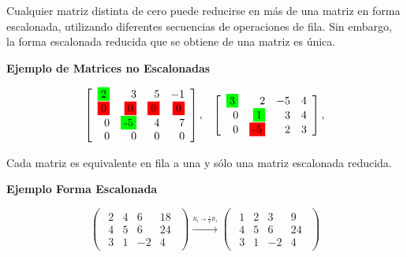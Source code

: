 \documentclass{article}
\begin{document}
Cualquier matriz distinta de cero puede reducirse en más de una matriz en forma escalonada, utilizando diferentes secuencias de operaciones de fila. Sin embargo, la forma escalonada reducida que se obtiene de una matriz es única.

\begin{large}
    \textbf{Ejemplo de Matrices no Escalonadas}
\end{large}

\begin{equation*}
    \begin{array}{lrl}
        {\left[\begin{array}{rrrr}
            \colorbox{green}{2} & 3 & 5 & -1  \\
            \colorbox{red}{0} & \colorbox{red}{0} & \colorbox{red}{0} & \colorbox{red}{0}\\
            0 & \colorbox{green}{-5} & 4 & 7 \\
            0 & 0 & 0 & 0
            \end{array}\right],} 
            & {\left[\begin{array}{rrrr}
            \colorbox{green}{3} & 2 & -5 & 4 \\
            0 & \colorbox{green}{1} & 3 & 4 \\
            0 & \colorbox{red}{-5} & 2 & 3
            \end{array}\right],} 
    \end{array}
\end{equation*}

\begin{tcolorbox}[colback=green!20!white,colframe=green!80!black,title=Unicidad de la Forma Escalonada Reducida]
    Cada matriz es equivalente en fila a una y sólo una matriz escalonada reducida.
\end{tcolorbox}

\begin{large}
    \textbf{Ejemplo Forma Escalonada}
\end{large}

\begin{equation*}
    \begin{pmatrix}
        \begin{array}{rrr|r}
            2 & 4 & 6 & 18\\
            4 & 5 & 6 & 24\\
            3 & 1 & -2 & 4
        \end{array}
    \end{pmatrix}
    \xrightarrow{\stackrel{R_1 \rightarrow \frac{1}{2}R_1}{}}
    \begin{pmatrix}
        \begin{array}{rrr|r}
            1 & 2 & 3 & 9\\
            4 & 5 & 6 & 24\\
            3 & 1 & -2 & 4
        \end{array}
    \end{pmatrix}
\end{equation*}
\end{document}
